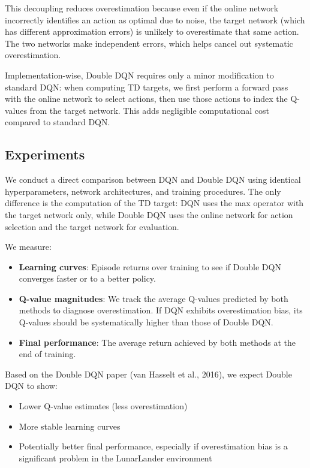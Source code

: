 \documentclass[11pt, a4paper, oneside]{memoir}
\begin{document}
This decoupling reduces overestimation because even if the online network incorrectly identifies an action as optimal due to noise, the target network (which has different approximation errors) is unlikely to overestimate that same action. The two networks make independent errors, which helps cancel out systematic overestimation.

Implementation-wise, Double DQN requires only a minor modification to standard DQN: when computing TD targets, we first perform a forward pass with the online network to select actions, then use those actions to index the Q-values from the target network. This adds negligible computational cost compared to standard DQN.

\subsection{Experiments}

We conduct a direct comparison between DQN and Double DQN using identical hyperparameters, network architectures, and training procedures. The only difference is the computation of the TD target: DQN uses the max operator with the target network only, while Double DQN uses the online network for action selection and the target network for evaluation.

We measure:
\begin{itemize}
\item \textbf{Learning curves}: Episode returns over training to see if Double DQN converges faster or to a better policy.
\item \textbf{Q-value magnitudes}: We track the average Q-values predicted by both methods to diagnose overestimation. If DQN exhibits overestimation bias, its Q-values should be systematically higher than those of Double DQN.
\item \textbf{Final performance}: The average return achieved by both methods at the end of training.
\end{itemize}

Based on the Double DQN paper (van Hasselt et al., 2016), we expect Double DQN to show:
\begin{itemize}
\item Lower Q-value estimates (less overestimation)
\item More stable learning curves
\item Potentially better final performance, especially if overestimation bias is a significant problem in the LunarLander environment
\end{itemize}
\end{document}
